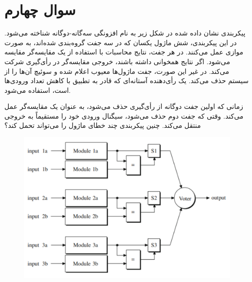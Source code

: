 \section{سوال چهارم}


پیکربندی نشان داده شده در شکل زیر به نام افزونگی سه‌گانه‌-دوگانه  شناخته می‌شود. در این پیکربندی، شش ماژول یکسان که در سه جفت گروه‌بندی شده‌اند، به صورت موازی عمل می‌کنند. در هر جفت، نتایج محاسبات با استفاده از یک مقایسه‌گر مقایسه می‌شود. اگر نتایج همخوانی داشته باشند، خروجی مقایسه‌گر در رأی‌گیری شرکت می‌کند. در غیر این صورت، جفت ماژول‌ها معیوب اعلام شده و سوئیچ آن‌ها را از سیستم حذف می‌کند. یک رأی‌دهنده آستانه‌ای که قادر به تطبیق با کاهش تعداد ورودی‌ها است، استفاده می‌شود.

زمانی که اولین جفت دوگانه از رأی‌گیری حذف می‌شود، به عنوان یک مقایسه‌گر عمل می‌کند. وقتی که جفت دوم حذف می‌شود، سیگنال ورودی خود را مستقیماً به خروجی منتقل می‌کند. چنین پیکربندی چند خطای ماژول را می‌تواند تحمل کند؟

\begin{figure}[h]
	\centering
	\includegraphics*[width=0.6\linewidth]{pics/img2.png}
\end{figure}


\begin{qsolve}
	
\end{qsolve}
